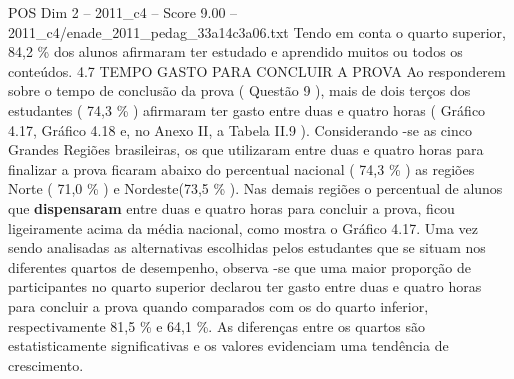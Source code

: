 \begin{textsample}{POS Dim 2 – 2011\_c4 – Score 9.00 – 2011\_c4/enade\_2011\_pedag\_33a14c3a06.txt}
Tendo em conta o quarto superior, 84,2 \% dos alunos afirmaram ter estudado e aprendido muitos ou todos os conteúdos. 4.7 TEMPO GASTO PARA CONCLUIR A PROVA Ao responderem sobre o tempo de conclusão da prova ( Questão 9 ), mais de dois terços dos estudantes ( 74,3 \% ) afirmaram ter gasto entre duas e quatro horas ( Gráfico 4.17, Gráfico 4.18 e, no Anexo II, a Tabela II.9 ).
Considerando -se as cinco Grandes Regiões brasileiras, os que utilizaram entre duas e quatro horas para finalizar a prova ficaram abaixo do percentual nacional ( 74,3 \% ) as regiões Norte ( 71,0 \% ) e Nordeste(73,5 \% ).
Nas demais regiões o percentual de alunos que \textbf{dispensaram} entre duas e quatro horas para concluir a prova, ficou ligeiramente acima da média nacional, como mostra o Gráfico 4.17.
Uma vez sendo analisadas as alternativas escolhidas pelos estudantes que se situam nos diferentes quartos de desempenho, observa -se que uma maior proporção de participantes no quarto superior declarou ter gasto entre duas e quatro horas para concluir a prova quando comparados com os do quarto inferior, respectivamente 81,5 \% e 64,1 \%.
As diferenças entre os quartos são estatisticamente significativas e os valores evidenciam uma tendência de crescimento.

\end{textsample}
